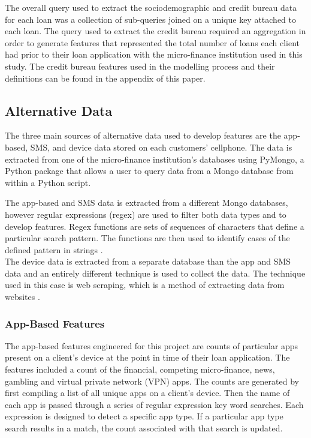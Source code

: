 The overall query used to extract the sociodemographic and credit bureau data for each loan was a collection of sub-queries joined on a unique key attached to each loan. The query used to extract the credit bureau required an aggregation in order to generate features that represented the total number of loans each client had prior to their loan application with the micro-finance institution used in this study. The credit bureau features used in the modelling process and their definitions can be found in the appendix of this paper.

\subsection{Alternative Data}

The three main sources of alternative data used to develop features are the app-based, SMS, and device data stored on each customers' cellphone. The data is extracted from one of the micro-finance institution's  databases using PyMongo, a Python package that allows a user to query data from a Mongo database from within a Python script. \newpage

The app-based and SMS data is extracted from a different Mongo databases, however regular expressions (regex) are used to filter both data types and to develop features. Regex functions are sets of sequences of characters that define a particular search pattern. The functions are then used to identify cases of the defined pattern in strings \parencite{Regex}. \\

The device data is extracted from a separate database than the app and SMS data and an entirely different technique is used to collect the data. The technique used in this case is web scraping, which is a method of extracting data from websites \parencite{WebScraping}. 

\subsubsection{App-Based Features}

The app-based features engineered for this project are counts of particular apps present on a client's device at the point in time of their loan application. The features included a count of the financial, competing micro-finance, news, gambling and virtual private network (VPN) apps. The counts are generated by first compiling a list of all unique apps on a client's device. Then the name of each app is passed through a series of regular expression key word searches. Each expression is designed to detect a specific app type. If a particular app type search results in a match, the count associated with that search is updated. \\


